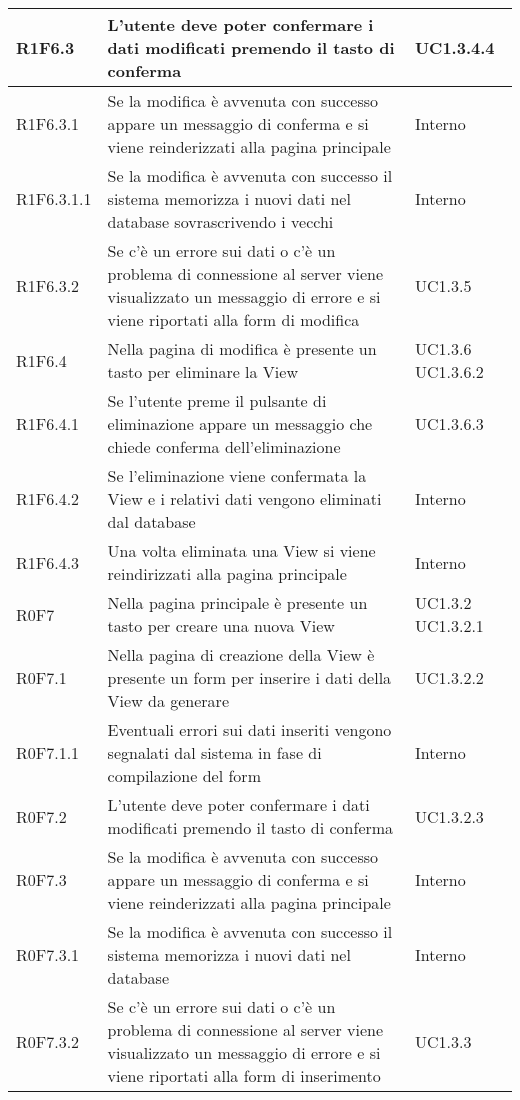 \begin{center}
\begin{longtable}{| p{2cm} | p{8cm} | p{2cm} |}
		\hline
		R1F6.3  &  L'utente deve poter confermare i dati modificati premendo il tasto di conferma  &  UC1.3.4.4 \\
		\hline
		R1F6.3.1  &  Se la modifica è avvenuta con successo appare un messaggio di conferma e si viene reinderizzati alla pagina principale  &  Interno \\
		\hline
		R1F6.3.1.1  &  Se la modifica è avvenuta con successo il sistema memorizza i nuovi dati nel database sovrascrivendo i vecchi  &  Interno \\
		\hline
		R1F6.3.2  &  Se c'è un errore sui dati o c'è un problema di connessione al server viene visualizzato un messaggio di errore e si viene riportati alla form di modifica  &  UC1.3.5 \\
		\hline
		R1F6.4  &  Nella pagina di modifica è presente un tasto per eliminare la View  &  UC1.3.6 \newline UC1.3.6.2 \\
		\hline
		R1F6.4.1  &  Se l'utente preme il pulsante di eliminazione appare un messaggio che chiede conferma dell'eliminazione  &  UC1.3.6.3 \\
		\hline
		R1F6.4.2  &  Se l'eliminazione viene confermata la View e i relativi dati vengono eliminati dal database  &  Interno \\
		\hline
		R1F6.4.3  &  Una volta eliminata una View si viene reindirizzati alla pagina principale  &  Interno \\
		\hline
		R0F7  &  Nella pagina principale è presente un tasto per creare una nuova View  &  UC1.3.2 \newline UC1.3.2.1 \\
		\hline
		R0F7.1  &  Nella pagina di creazione della View è presente un form per inserire i dati della View da generare  &  UC1.3.2.2 \\
		\hline
		R0F7.1.1  &  Eventuali errori sui dati inseriti vengono segnalati dal sistema in fase di compilazione del form  &  Interno \\
		\hline
		R0F7.2  &  L'utente deve poter confermare i dati modificati premendo il tasto di conferma  &  UC1.3.2.3 \\
		\hline
		R0F7.3  &  Se la modifica è avvenuta con successo appare un messaggio di conferma e si viene reinderizzati alla pagina principale  &  Interno \\
		\hline
		R0F7.3.1  &  Se la modifica è avvenuta con successo il sistema memorizza i nuovi dati nel database  &  Interno \\
		\hline
		R0F7.3.2  &  Se c'è un errore sui dati o c'è un problema di connessione al server viene visualizzato un messaggio di errore e si viene riportati alla form di inserimento  &  UC1.3.3 \\

\end{longtable}
\end{center}
